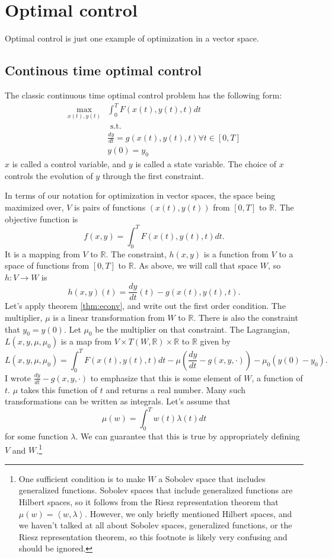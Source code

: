 \documentclass[12pt,reqno]{amsart}
\theoremstyle{definition}
\def\R{\mathbb{R}}
\newcommand{\iprod}[2]{\left\langle {#1} , {#2} \right\rangle}
\renewcommand{\to}{{\rightarrow}}
\begin{document}
\section{Optimal control}


Optimal control is just one example of optimization in a vector
space. 

\subsection{Continous time optimal control}
The classic continuous time optimal control problem has the
following form: 
\begin{align*}
  \max_{x(t),y(t)} & \int_0^T F(x(t),y(t),t) dt \\
  & \text{ s.t.} \\
  & \frac{d y}{dt} = g(x(t),y(t),t) \forall t \in [0,T] \\ 
  & y(0) = y_0
\end{align*}
$x$ is called a control variable, and $y$ is called a state
variable. The choice of $x$ controls the evolution of $y$ through the
first constraint.

In terms of our notation for optimization in vector spaces, the space
being maximized over, $V$ is pairs of functions $(x(t),y(t))$ from
$[0,T]$ to $\R$. The objective function is 
\[ f(x,y) = \int_0^T F(x(t),y(t),t) dt. \]
It is a mapping from $V$ to $\R$. The constraint, $h(x,y)$ is a
function from $V$ to a space of functions from $[0,T]$ to $\R$. As
above, we will call that space $W$, so $h:V \to W$ is 
\[ h(x,y)(t) = \frac{dy}{dt}(t) - g(x(t),y(t),t). \]
Let's apply theorem \ref{thm:econv}, and write out the first order
condition. The multiplier, $\mu$ is a linear transformation from $W$
to $\R$. There is also the constraint that $y_0 = y(0)$. Let $\mu_0$
be the multiplier on that constraint.
The Lagrangian, $L(x,y,\mu,\mu_0)$ is a map from $V \times T(W,\R)
\times \R$
to $\R$ given by
\[ L(x,y,\mu,\mu_0) = \int_0^T F(x(t),y(t),t) dt  -
\mu\left(\frac{dy}{dt} - g(x,y,\cdot) \right) - \mu_0(y(0) - y_0). \]
I wrote $\frac{dy}{dt} - g(x,y,\cdot)$ to emphasize that this is some
element of $W$, a function of $t$. $\mu$ takes this function of $t$
and returns a real number. Many such transformations can be written as
integrals. Let's assume that
\[ \mu(w) = \int_{0}^T w(t) \lambda(t) dt \]
for some function $\lambda$.  We can guarantee that this is true by
appropriately defining $V$ and $W$.\footnote{One sufficient condition
  is to make $W$ a Sobolev space that includes generalized
  functions. Sobolev 
  spaces that include generalized functions are Hilbert spaces, so it
  follows from the Riesz representation theorem that $\mu(w) =
  \iprod{w}{\lambda}$. However, we only briefly mentioned Hilbert
  spaces, and we haven't talked at all about Sobolev spaces,
  generalized functions, or the Riesz representation theorem, so this
  footnote is likely very confusing and should be ignored.}
\end{document}
